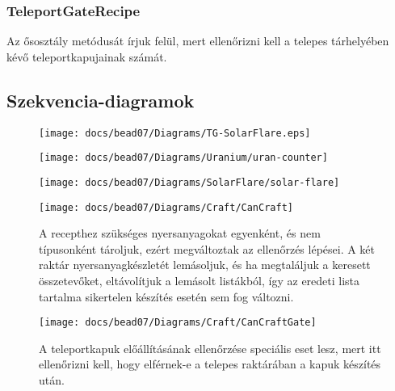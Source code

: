 \documentclass[../../projlab]{subfiles}
\begin{document}
\subsubsection{TeleportGateRecipe}
\begin{class-template-attribute}
\end{class-template-attribute}
\begin{class-template-method}
                {Az ősosztály metódusát írjuk felül, mert ellenőrizni kell a telepes tárhelyében kévő teleportkapujainak számát.}
\end{class-template-method}

\subsection{Szekvencia-diagramok}


\begin{figure}[H] 
    \centering 
    \texttt{[image: docs/bead07/Diagrams/TG-SolarFlare.eps]} 
    \caption{} 
\end{figure}

\begin{figure}[H] 
    \centering 
    \texttt{[image: docs/bead07/Diagrams/Uranium/uran-counter]} 
    \caption{} 
\end{figure}

\begin{figure}[H] 
    \centering 
    \texttt{[image: docs/bead07/Diagrams/SolarFlare/solar-flare]} 
    \caption{} 
\end{figure}

\begin{figure}[H] 
    \centering 
    \texttt{[image: docs/bead07/Diagrams/Craft/CanCraft]} 
    \caption{A recepthez szükséges nyersanyagokat egyenként, és nem típusonként tároljuk, ezért megváltoztak az ellenőrzés lépései. A két raktár nyersanyagkészletét lemásoljuk, és ha megtaláljuk a keresett összetevőket, eltávolítjuk a lemásolt listákból, így az eredeti lista tartalma sikertelen készítés esetén sem fog változni. } 
\end{figure} 

\begin{figure}[H] 
    \centering 
    \texttt{[image: docs/bead07/Diagrams/Craft/CanCraftGate]} 
    \caption{A teleportkapuk előállításának ellenőrzése speciális eset lesz, mert itt ellenőrizni kell, hogy elférnek-e a telepes raktárában a kapuk készítés után.} 
\end{figure} 
\end{document}
